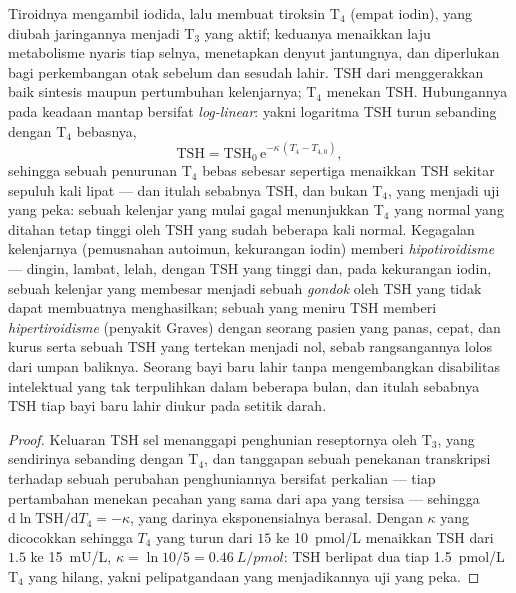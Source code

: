 \begin{proposition}\label{prop:b3:endocrinology:thyroid}
%
Tiroidnya mengambil iodida, lalu membuat tiroksin T$_{4}$ (empat
iodin), yang diubah jaringannya menjadi T$_{3}$ yang aktif; keduanya menaikkan
laju metabolisme nyaris tiap selnya, menetapkan denyut jantungnya, dan
diperlukan bagi perkembangan otak sebelum dan sesudah lahir. TSH dari
 menggerakkan baik sintesis maupun pertumbuhan kelenjarnya; T$_{4}$
menekan TSH. Hubungannya pada keadaan mantap bersifat \emph{log-linear}: yakni
logaritma TSH turun sebanding dengan T$_{4}$ bebasnya,
\[
\text{TSH} = \text{TSH}_{0}\,\mathrm{e}^{-\kappa\,(T_{4} - T_{4,0})},
\]
sehingga sebuah penurunan T$_{4}$ bebas sebesar sepertiga menaikkan TSH sekitar sepuluh kali lipat ---
dan itulah sebabnya TSH, dan bukan T$_{4}$, yang menjadi uji yang peka: sebuah kelenjar yang
mulai gagal menunjukkan T$_{4}$ yang normal yang ditahan tetap tinggi oleh TSH yang sudah beberapa
kali normal. Kegagalan kelenjarnya (pemusnahan autoimun, kekurangan
iodin) memberi \emph{hipotiroidisme} --- dingin, lambat, lelah, dengan
TSH yang tinggi dan, pada kekurangan iodin, sebuah kelenjar yang membesar menjadi sebuah
\emph{gondok} oleh TSH yang tidak dapat membuatnya menghasilkan; sebuah  yang
meniru TSH memberi \emph{hipertiroidisme} (penyakit Graves) dengan seorang pasien yang panas,
cepat, dan kurus serta sebuah TSH yang tertekan menjadi nol, sebab
rangsangannya lolos dari umpan baliknya. Seorang bayi baru lahir tanpa 
mengembangkan disabilitas intelektual yang tak terpulihkan dalam beberapa bulan, dan itulah
sebabnya TSH tiap bayi baru lahir diukur pada setitik darah.
\end{proposition}
\begin{proof}
Keluaran TSH sel  menanggapi penghunian reseptornya oleh
T$_{3}$, yang sendirinya sebanding dengan T$_{4}$, dan tanggapan sebuah
penekanan transkripsi terhadap sebuah perubahan penghuniannya bersifat perkalian
--- tiap pertambahan  menekan pecahan yang sama dari apa yang
tersisa --- sehingga $\mathrm{d}\ln\text{TSH}/\mathrm{d}T_{4} = -\kappa$,
yang darinya eksponensialnya berasal. Dengan $\kappa$ yang dicocokkan sehingga $T_{4}$ yang turun
dari $15$ ke \qty{10}{pmol/L} menaikkan TSH dari $1.5$ ke \qty{15}{mU/L},
$\kappa = \ln 10/5 = \qty{0.46}{L/pmol}$: TSH berlipat dua tiap
\qty{1.5}{pmol/L} T$_{4}$ yang hilang, yakni pelipatgandaan yang menjadikannya
uji yang peka.
\end{proof}

